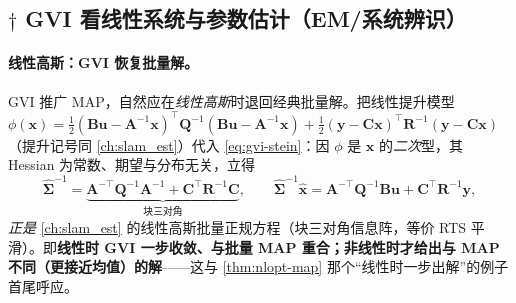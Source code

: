 \subsection{\texorpdfstring{$\dagger$}{x} GVI 看线性系统与参数估计（EM/系统辨识）}
\label{sec:nlopt-gvi-param}

\paragraph{线性高斯：GVI 恢复批量解。}
GVI 推广 MAP，自然应在\emph{线性高斯}时退回经典批量解。把线性提升模型 $\phi(\mathbf{x})=\tfrac12(\mathbf{B}\mathbf{u}-\mathbf{A}^{-1}\mathbf{x})^\top\mathbf{Q}^{-1}(\mathbf{B}\mathbf{u}-\mathbf{A}^{-1}\mathbf{x})+\tfrac12(\mathbf{y}-\mathbf{C}\mathbf{x})^\top\mathbf{R}^{-1}(\mathbf{y}-\mathbf{C}\mathbf{x})$（提升记号同 \cref{ch:slam_est}）代入 \cref{eq:gvi-stein}：因 $\phi$ 是 $\mathbf{x}$ 的\emph{二次}型，其 Hessian 为常数、期望与分布无关，立得
\begin{equation}
  \hat{\boldsymbol{\Sigma}}^{-1}=\underbrace{\mathbf{A}^{-\top}\mathbf{Q}^{-1}\mathbf{A}^{-1}+\mathbf{C}^\top\mathbf{R}^{-1}\mathbf{C}}_{\text{块三对角}},\qquad
  \hat{\boldsymbol{\Sigma}}^{-1}\hat{\mathbf{x}}=\mathbf{A}^{-\top}\mathbf{Q}^{-1}\mathbf{B}\mathbf{u}+\mathbf{C}^\top\mathbf{R}^{-1}\mathbf{y},
  \label{eq:gvi-linear}
\end{equation}
\emph{正是} \cref{ch:slam_est} 的线性高斯批量正规方程（块三对角信息阵，等价 RTS 平滑）。即\textbf{线性时 GVI 一步收敛、与批量 MAP 重合；非线性时才给出与 MAP 不同（更接近均值）的解}——这与 \cref{thm:nlopt-map} 那个“线性时一步出解”的例子首尾呼应。

